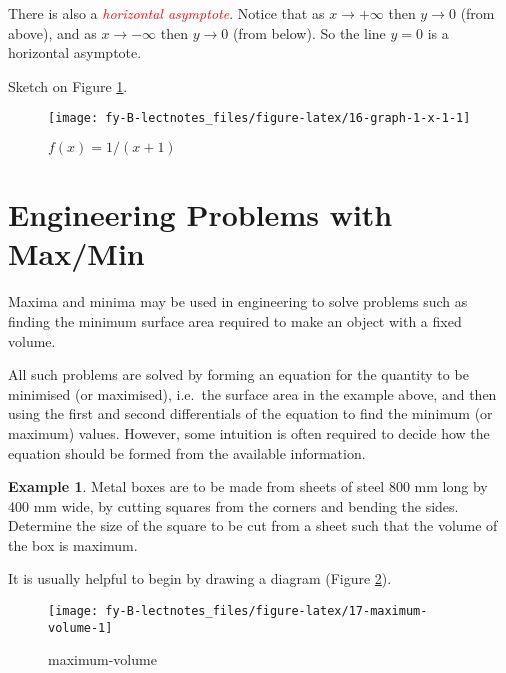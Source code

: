 \documentclass[
  11pt,
  oneside]{book}
\newcommand{\slide}{}
\theoremstyle{definition}
\theoremstyle{definition}
\newtheorem{example}{Example}[chapter]
\theoremstyle{definition}
\theoremstyle{definition}
\theoremstyle{remark}
\begin{document}
There is also a \textcolor{red}{\em horizontal asymptote}. Notice that as \(x\to+\infty\) then \(y\to 0\) (from above), and as \(x\to-\infty\) then \(y\to0\) (from below). So the line \(y=0\) is a horizontal asymptote.

Sketch on Figure \ref{fig:16-graph-1-x-1}.

\begin{figure}

{\centering \texttt{[image: fy-B-lectnotes\_files/figure-latex/16-graph-1-x-1-1]} 

}

\caption{$f(x)=1/(x+1)$}\label{fig:16-graph-1-x-1}
\end{figure}

\slide

\section{Engineering Problems with Max/Min}\label{engineering-problems-with-maxmin}

Maxima and minima may be used in engineering to solve problems such as finding the minimum surface area required to make an object with a fixed volume.

All such problems are solved by forming an equation for the quantity to be minimised (or maximised), i.e.~the surface area in the example above, and then using the first and second differentials of the equation to find the minimum (or maximum) values. However, some intuition is often required to decide how the equation should be formed from the available information.

\begin{example}
Metal boxes are to be made from sheets of steel 800 mm long by 400 mm wide, by cutting squares from the corners and bending the sides. Determine the size of the square to be cut from a sheet such that the volume of the box is maximum.
\end{example}

It is usually helpful to begin by drawing a diagram (Figure \ref{fig:17-maximum-volume}).

\begin{figure}

{\centering \texttt{[image: fy-B-lectnotes\_files/figure-latex/17-maximum-volume-1]} 

}

\caption{maximum-volume}\label{fig:17-maximum-volume}
\end{figure}
\end{document}
